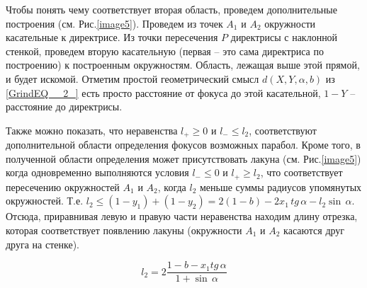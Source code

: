\documentclass[a4paper]{article}
\begin{document}
Чтобы понять чему соответствует вторая область, проведем дополнительные построения (см. Рис.\ref{image5}). Проведем из точек $A_{1} $ и $A_{2}$ окружности касательные  к директрисе. Из точки пересечения $P$ директрисы с наклонной стенкой, проведем вторую касательную (первая -- это сама директриса по построению) к построенным окружностям. Область, лежащая выше этой прямой, и будет искомой. Отметим простой геометрический смысл $d\left(X,Y,\alpha ,b\right)$ из \eqref{GrindEQ__2_} есть просто расстояние от фокуса до этой касательной, $1-Y$ -- расстояние до директрисы.

Также можно показать, что неравенства $l_{+} \ge 0$ и  $l_{-} \le l_{2} $, соответствуют дополнительной области определения фокусов возможных парабол. Кроме того, в полученной области определения может присутствовать лакуна (см. Рис.\ref{image5}) когда одновременно выполняются условия  $l_{-} \le 0$ и $l_{+} \ge l_{2} $, что соответствует пересечению окружностей  $A_{1} $ и $A_{2} $, когда $l_{2} $ меньше суммы радиусов упомянутых окружностей. Т.е. $l_{2} \le \left(1-y_{1} \right)+\left(1-y_{2} \right)=2\left(1-b\right)-2x_{1} \, tg\, \alpha -l_{2} \sin \, \alpha $. Отсюда, приравнивая левую и правую части неравенства находим длину отрезка, которая соответствует появлению лакуны (окружности $A_{1}$ и $A_{2}$ касаются друг друга на стенке).

\begin{equation} \label{GrindEQ__4_} l_{2} =2\frac{1-b-x_{1} tg\, \alpha }{1+\sin \, \alpha }  \end{equation}

%
%
\end{document}
